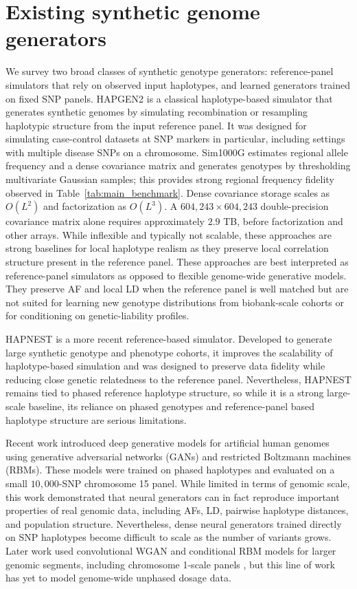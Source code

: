 \documentclass{article}
\begin{document}
\section{Existing synthetic genome generators}
\label{app:related-work}

We survey two broad classes of synthetic genotype generators: reference-panel simulators that rely on observed input haplotypes, and learned generators trained on fixed SNP panels. HAPGEN2 \cite{su2011hapgen2} is a classical haplotype-based simulator that generates synthetic genomes by simulating recombination or resampling haplotypic structure from the input reference panel. It was designed for simulating case-control datasets at SNP markers in particular, including settings with multiple disease SNPs on a chromosome. Sim1000G \cite{dimitromanolakis2019sim1000g} estimates regional allele frequency and a dense covariance matrix and generates genotypes by thresholding multivariate Gaussian samples; this provides strong regional frequency fidelity observed in Table~\ref{tab:main_benchmark}. Dense covariance storage scales as \(O(L^2)\) and factorization as \(O(L^3)\). A \(604{,}243\times604{,}243\) double-precision covariance matrix alone requires approximately \(2.9\) TB, before factorization and other arrays. While inflexible and typically not scalable, these approaches are strong baselines for local haplotype realism as they preserve local correlation structure present in the reference panel. These approaches are best interpreted as reference-panel simulators as opposed to flexible genome-wide generative models. They preserve AF and local LD when the reference panel is well matched but are not suited for learning new genotype distributions from biobank-scale cohorts or for conditioning on genetic-liability profiles.

HAPNEST \cite{wharrie2023hapnest} is a more recent reference-based simulator. Developed to generate large synthetic genotype and phenotype cohorts, it improves the scalability of haplotype-based simulation and was designed to preserve data fidelity while reducing close genetic relatedness to the reference panel. Nevertheless, HAPNEST remains tied to phased reference haplotype structure, so while it is a strong large-scale baseline, its reliance on phased genotypes and reference-panel based haplotype structure are serious limitations.

Recent work \cite{yelmenGAN} introduced deep generative models for artificial human genomes using generative adversarial networks (GANs) and restricted Boltzmann machines (RBMs). These models were trained on phased haplotypes and evaluated on a small \(10{,}000\)-SNP chromosome 15 panel. While limited in terms of genomic scale, this work demonstrated that neural generators can in fact reproduce important properties of real genomic data, including AFs, LD, pairwise haplotype distances, and population structure. Nevertheless, dense neural generators trained directly on SNP haplotypes become difficult to scale as the number of variants grows. Later work used convolutional WGAN and conditional RBM models for larger genomic segments, including chromosome 1-scale panels \cite{yelmen2023deep}, but this line of work has yet to model genome-wide unphased dosage data. 
\end{document}
